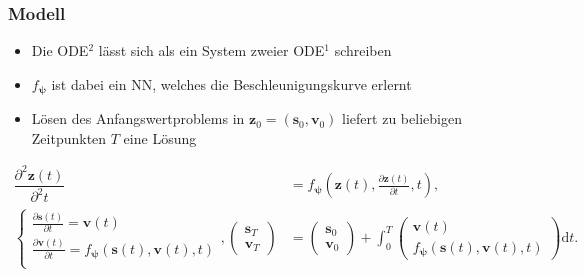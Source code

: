 \begin{frame}
\frametitle{Modell}
    \begin{itemize}
    	\item Die ODE$^{2}$ lässt sich als ein System zweier ODE$^{1}$ schreiben\\
    	\item $f_{\boldsymbol{\psi}}$ ist dabei ein NN, welches die Beschleunigungskurve erlernt
    	\item Lösen des Anfangswertproblems in $\mathbf{z}_{0}=(\mathbf{s}_{0}, \mathbf{v}_{0})$ liefert zu beliebigen Zeitpunkten $T$ eine Lösung
	\end{itemize}
    {\footnotesize\begin{align*}
    \dfrac{\partial^2 \mathbf{z}(t)}{\partial^2 t}&=f_{\boldsymbol{\psi}}\left(\mathbf{z}(t), \tfrac{\partial \mathbf{z}(t)}{\partial t}, t\right), \\
    \begin{cases*}
    \tfrac{\partial \mathbf{s}(t)}{\partial t}=\mathbf v(t) \\
    \tfrac{\partial \mathbf{v}(t)}{\partial t}=f_{\boldsymbol{\psi}}(\mathbf s(t), \mathbf v(t), t) \\
    \end{cases*},
    \left(\begin{array}{cc}
    \mathbf s_{T} \\
    \mathbf v_{T}
    \end{array}\right)
    &=
    \left(\begin{array}{cc}
    \mathbf s_{0} \\
    \mathbf v_{0}
    \end{array}\right)
    +
    \int_{0}^{T}
    \left(\begin{array}{cc}
    \mathbf v(t) \\
    f_{\boldsymbol{\psi}}(\mathbf s(t), \mathbf v(t), t)
    \end{array}\right)
    \mathrm{d}t.
    \end{align*}}
\end{frame}




